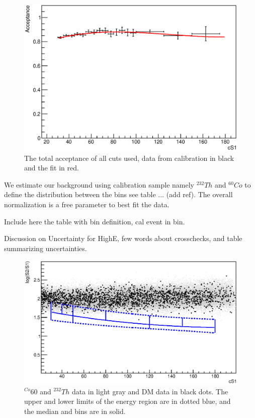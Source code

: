 \begin{figure}[h!]
\begin{minipage}{1.\linewidth}
\centerline{\includegraphics[width=1.\linewidth]{Figures/Acceptance.eps}}
\end{minipage}
\caption{The total acceptance of all cuts used, data from calibration in black and the fit in red.}
\label{fig:Acc}
\end{figure}

We estimate our background using calibration sample namely $^{232}Th$ and $^{60}Co$ to define the distribution between the bins see table ... (add ref). The overall normalization is a free parameter to best fit the data.


Include here the table  with bin definition, cal event in bin.

Discussion on Uncertainty for HighE, few words about crosschecks, and table summarizing uncertainties.

\begin{figure}[h!]
\begin{minipage}{1.\linewidth}
\centerline{\includegraphics[width=1.\linewidth]{Figures/phasespace.eps}}
\end{minipage}
\caption{$^{Co}60$ and $^{232}Th$ data in light gray and DM data in black dots. The upper and lower limits of the energy region are in dotted blue, and the median and bins are in solid.}
\label{fig:phasespace}
\end{figure}  


